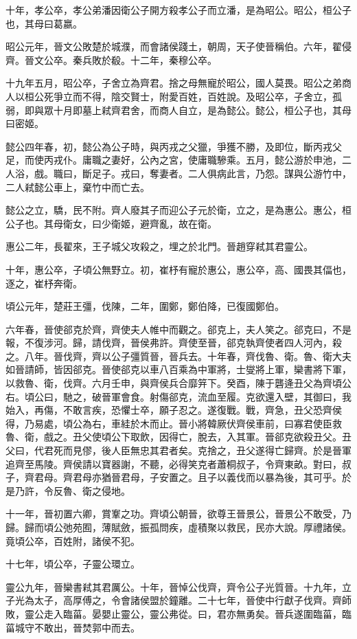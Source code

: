 十年，孝公卒，孝公弟潘因衛公子開方殺孝公子而立潘，是為昭公。昭公，桓公子也，其母曰葛嬴。

昭公元年，晉文公敗楚於城濮，而會諸侯踐土，朝周，天子使晉稱伯。六年，翟侵齊。晉文公卒。秦兵敗於殽。十二年，秦穆公卒。

十九年五月，昭公卒，子舍立為齊君。捨之母無寵於昭公，國人莫畏。昭公之弟商人以桓公死爭立而不得，陰交賢士，附愛百姓，百姓說。及昭公卒，子舍立，孤弱，即與眾十月即墓上弒齊君舍，而商人自立，是為懿公。懿公，桓公子也，其母曰密姬。

懿公四年春，初，懿公為公子時，與丙戎之父獵，爭獲不勝，及即位，斷丙戎父足，而使丙戎仆。庸職之妻好，公內之宮，使庸職驂乘。五月，懿公游於申池，二人浴，戲。職曰，斷足子。戎曰，奪妻者。二人俱病此言，乃怨。謀與公游竹中，二人弒懿公車上，棄竹中而亡去。

懿公之立，驕，民不附。齊人廢其子而迎公子元於衛，立之，是為惠公。惠公，桓公子也。其母衛女，曰少衛姬，避齊亂，故在衛。

惠公二年，長翟來，王子城父攻殺之，埋之於北門。晉趙穿弒其君靈公。

十年，惠公卒，子頃公無野立。初，崔杼有寵於惠公，惠公卒，高、國畏其偪也，逐之，崔杼奔衛。

頃公元年，楚莊王彊，伐陳，二年，圍鄭，鄭伯降，已復國鄭伯。

六年春，晉使郤克於齊，齊使夫人帷中而觀之。郤克上，夫人笑之。郤克曰，不是報，不復涉河。歸，請伐齊，晉侯弗許。齊使至晉，郤克執齊使者四人河內，殺之。八年。晉伐齊，齊以公子彊質晉，晉兵去。十年春，齊伐魯、衛。魯、衛大夫如晉請師，皆因郤克。晉使郤克以車八百乘為中軍將，士燮將上軍，欒書將下軍，以救魯、衛，伐齊。六月壬申，與齊侯兵合靡笄下。癸酉，陳于礱逄丑父為齊頃公右。頃公曰，馳之，破晉軍會食。射傷郤克，流血至履。克欲還入壁，其御曰，我始入，再傷，不敢言疾，恐懼士卒，願子忍之。遂復戰。戰，齊急，丑父恐齊侯得，乃易處，頃公為右，車絓於木而止。晉小將韓厥伏齊侯車前，曰寡君使臣救魯、衛，戲之。丑父使頃公下取飲，因得亡，脫去，入其軍。晉郤克欲殺丑父。丑父曰，代君死而見僇，後人臣無忠其君者矣。克捨之，丑父遂得亡歸齊。於是晉軍追齊至馬陵。齊侯請以寶器謝，不聽，必得笑克者蕭桐叔子，令齊東畝。對曰，叔子，齊君母。齊君母亦猶晉君母，子安置之。且子以義伐而以暴為後，其可乎。於是乃許，令反魯、衛之侵地。

十一年，晉初置六卿，賞鞌之功。齊頃公朝晉，欲尊王晉景公，晉景公不敢受，乃歸。歸而頃公弛苑囿，薄賦斂，振孤問疾，虛積聚以救民，民亦大說。厚禮諸侯。竟頃公卒，百姓附，諸侯不犯。

十七年，頃公卒，子靈公環立。

靈公九年，晉欒書弒其君厲公。十年，晉悼公伐齊，齊令公子光質晉。十九年，立子光為太子，高厚傅之，令會諸侯盟於鐘離。二十七年，晉使中行獻子伐齊。齊師敗，靈公走入臨菑。晏嬰止靈公，靈公弗從。曰，君亦無勇矣。晉兵遂圍臨菑，臨菑城守不敢出，晉焚郭中而去。

